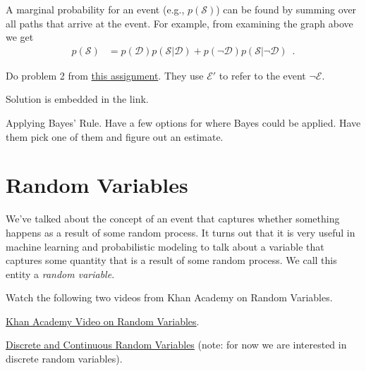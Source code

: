 \documentclass[assignment01_Solutions]{subfiles}
\begin{document}
A marginal probability for an event (e.g., $p(\mathcal{S})$) can be found by summing over all paths that arrive at the event.  For example, from examining the graph above we get
\begin{align}
p(\mathcal{S}) &= p(\mathcal{D}) p(\mathcal{S}|\mathcal{D}) + p(\neg \mathcal{D}) p(\mathcal{S}|\neg \mathcal{D})  \enspace .
\end{align}


\begin{exercise}[(20 minutes)]
Do problem 2 from \href{http://wwwf.imperial.ac.uk/~atw/Bayes.pdf}{this assignment}.  They use $\mathcal{E}'$ to refer to the event $\neg \mathcal{E}$.
\begin{boxedsolution}
Solution is embedded in the link.
\end{boxedsolution}
\end{exercise}

\begin{exercise}[(30 minutes)]
Applying Bayes' Rule.  Have a few options for where Bayes could be applied.  Have them pick one of them and figure out an estimate.
\end{exercise}


\section{Random Variables}

We've talked about the concept of an event that captures whether something happens as a result of some random process.  It turns out that it is very useful in machine learning and probabilistic modeling to talk about a variable that captures some quantity that is a result of some random process.  We call this entity a \emph{random variable}.

\begin{externalresources}[(20 minutes)]
Watch the following two videos from Khan Academy on Random Variables.
\bi
\item \href{https://www.khanacademy.org/math/statistics-probability/random-variables-stats-library/random-variables-discrete/v/random-variables}{Khan Academy Video on Random Variables}.
\item \href{https://www.khanacademy.org/math/statistics-probability/random-variables-stats-library/random-variables-discrete/v/discrete-and-continuous-random-variables}{Discrete and Continuous Random Variables} (note: for now we are interested in discrete random variables).
\ei
\end{externalresources}
\end{document}
